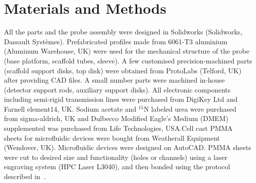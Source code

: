 \documentclass[preprint,5p]{elsarticle}
\begin{document}
\section{Materials and Methods}
All the parts and the probe assembly were designed in Solidworks (Solidworks,
Dassault Syst\`{e}mes). Prefabricated profiles made from 6061-T3 aluminium
(Aluminum Warehouse, UK) were used for the mechanical structure of the probe
(base platform, scaffold tubes, sleeve). A few customised precision-machined
parts (scaffold support disks, top disk) were obtained from ProtoLabs (Telford,
UK) after providing CAD files. A small number parts were machined in-house
(detector support rods, auxiliary support disks). All electronic components
including semi-rigid transmission lines were purchased from DigiKey Ltd \cbstart and Farnell element14, UK. Sodium acetate and $^{15}$N labeled urea were purchased from sigma-aldrich, UK and Dulbecco Modified Eagle's Medium (DMEM) supplemented was purchased from Life Technologies, USA.\cbend Cell cast PMMA sheets for microfluidic devices were bought from Weatherall Equipment
(Wendover, UK). Microfluidic devices were designed on AutoCAD. PMMA sheets were
cut to desired size and functionality (holes or channels) using a laser
engraving system  (HPC Laser L3040), and then bonded using the protocol
described in~\cite{yilmaz_bonding}.
\end{document}
